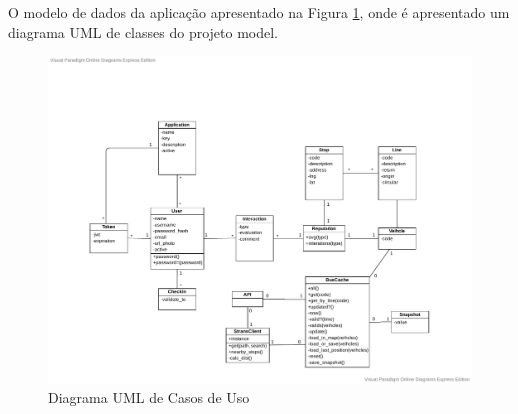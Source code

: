 O modelo de dados da aplicação apresentado na Figura \ref{fig:diagram_class}, onde é apresentado um diagrama 
UML de classes do projeto model.

\begin{figure}[H]
  \caption{\label{fig:diagram_class}Diagrama UML de Casos de Uso}
  \centering
  \includegraphics[scale=0.6]{imagens/diagramclass-sb.pdf}
\end{figure}

